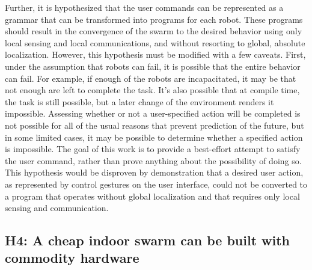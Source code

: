 Further, it is hypothesized that the user commands can be represented as a grammar that can be transformed into programs for each robot. 
These programs should result in the convergence of the swarm to the desired behavior using only local sensing and local communications, and without resorting to global, absolute localization. 
However, this hypothesis must be modified with a few caveats. 
First, under the assumption that robots can fail, it is possible that the entire behavior can fail. 
For example, if enough of the robots are incapacitated, it may be that not enough are left to complete the task. 
It's also possible that at compile time, the task is still possible, but a later change of the environment renders it impossible. 
Assessing whether or not a user-specified action will be completed is not possible for all of the usual reasons that prevent prediction of the future, but in some limited cases, it may be possible to determine whether a specified action is impossible. The goal of this work is to provide a best-effort attempt to satisfy the user command, rather than prove anything about the possibility of doing so. 
This hypothesis would be disproven by demonstration that a desired user action, as represented by control gestures on the user interface, could not be converted to a program that operates without global localization and that requires only local sensing and communication.

\subsection{H4: A cheap indoor swarm can be built with commodity hardware}

